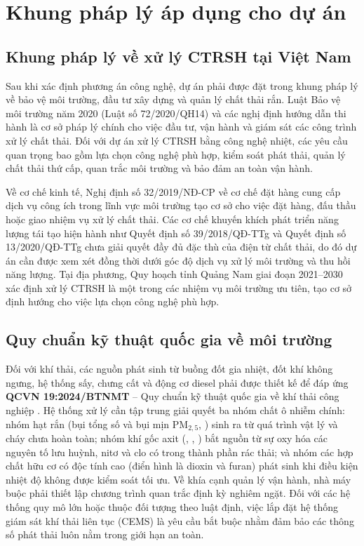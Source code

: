 \documentclass[../main.tex]{subfiles}
\begin{document}
\section{Khung pháp lý áp dụng cho dự án}

\subsection{Khung pháp lý về xử lý CTRSH tại Việt Nam}

Sau khi xác định phương án công nghệ, dự án phải được đặt trong khung pháp lý về bảo vệ môi trường, đầu tư xây dựng và quản lý chất thải rắn. Luật Bảo vệ môi trường năm 2020 (Luật số 72/2020/QH14) \cite{LuatBVMT2020} và các nghị định hướng dẫn thi hành là cơ sở pháp lý chính cho việc đầu tư, vận hành và giám sát các công trình xử lý chất thải. Đối với dự án xử lý CTRSH bằng công nghệ nhiệt, các yêu cầu quan trọng bao gồm lựa chọn công nghệ phù hợp, kiểm soát phát thải, quản lý chất thải thứ cấp, quan trắc môi trường và bảo đảm an toàn vận hành.

Về cơ chế kinh tế, Nghị định số 32/2019/NĐ-CP về cơ chế đặt hàng cung cấp dịch vụ công ích trong lĩnh vực môi trường \cite{NghiDinh32_2019_NDCP} tạo cơ sở cho việc đặt hàng, đấu thầu hoặc giao nhiệm vụ xử lý chất thải. Các cơ chế khuyến khích phát triển năng lượng tái tạo hiện hành như Quyết định số 39/2018/QĐ-TTg và Quyết định số 13/2020/QĐ-TTg \cite{QuyetDinh39_2018_QDTTg,QuyetDinh13_2020_QDTTg} chưa giải quyết đầy đủ đặc thù của điện từ chất thải, do đó dự án cần được xem xét đồng thời dưới góc độ dịch vụ xử lý môi trường và thu hồi năng lượng. Tại địa phương, Quy hoạch tỉnh Quảng Nam giai đoạn 2021--2030 \cite{QuyHoachQuangNam2024} xác định xử lý CTRSH là một trong các nhiệm vụ môi trường ưu tiên, tạo cơ sở định hướng cho việc lựa chọn công nghệ phù hợp.

\subsection{Quy chuẩn kỹ thuật quốc gia về môi trường}

Đối với khí thải, các nguồn phát sinh từ buồng đốt gia nhiệt, đốt khí không ngưng, hệ thống sấy, chưng cất và động cơ diesel phải được thiết kế để đáp ứng \textbf{QCVN 19:2024/BTNMT} -- Quy chuẩn kỹ thuật quốc gia về khí thải công nghiệp \cite{QCVN19_2024_BTNMT}. Hệ thống xử lý cần tập trung giải quyết ba nhóm chất ô nhiễm chính: nhóm hạt rắn (bụi tổng số và bụi mịn PM$_{2,5}$, ) sinh ra từ quá trình vật lý và cháy chưa hoàn toàn; nhóm khí gốc axit (, , ) bắt nguồn từ sự oxy hóa các nguyên tố lưu huỳnh, nitơ và clo có trong thành phần rác thải; và nhóm các hợp chất hữu cơ có độc tính cao (điển hình là dioxin và furan) phát sinh khi điều kiện nhiệt độ không được kiểm soát tối ưu. Về khía cạnh quản lý vận hành, nhà máy buộc phải thiết lập chương trình quan trắc định kỳ nghiêm ngặt. Đối với các hệ thống quy mô lớn hoặc thuộc đối tượng theo luật định, việc lắp đặt hệ thống giám sát khí thải liên tục (CEMS) là yêu cầu bắt buộc nhằm đảm bảo các thông số phát thải luôn nằm trong giới hạn an toàn.
\end{document}
